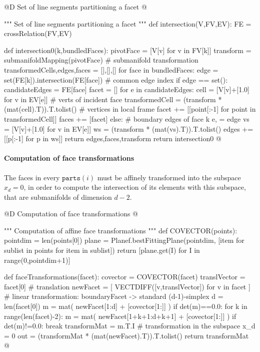 \documentclass[11pt,oneside]{article}    %
\begin{document}
@D Set of line segments partitioning a facet
@{""" Set of line segments partitioning a facet """
def intersection(V,FV,EV):
    FE = crossRelation(FV,EV)

    def intersection0(k,bundledFaces):
        pivotFace = [V[v] for v in FV[k]]
        transform = submanifoldMapping(pivotFace)  # submanifold transformation
        transformedCells,edges,faces = [],[],[]
        for face in bundledFaces:
            edge = set(FE[k]).intersection(FE[face])  # common edge index
            if edge == set():
                candidateEdges = FE[face]
                facet = []
                for e in candidateEdges:
                    cell = [V[v]+[1.0] for v in EV[e]]  # verts of incident face
                    transformedCell = (transform * (mat(cell).T)).T.tolist()  
                    # vertices in local frame
                    facet += [[point[:-1] for point in transformedCell]]
                faces += [facet]
            else:  # boundary edges of face k
                e, = edge
                vs = [V[v]+[1.0] for v in EV[e]]
                ws = (transform * (mat(vs).T)).T.tolist()
                edges += [[p[:-1] for p in ws]]
        return edges,faces,transform
    return intersection0    
@}



\paragraph{Computation of face transformations}
The faces in every $\texttt{parts}(i)$ must be affinely transformed into the subspace $x_d=0$, in order to compute the intersection of its elements with this subspace, that are submanifolds of dimension $d-2$.

@D Computation of face transformations
@{""" Computation of affine face transformations """
def COVECTOR(points):
    pointdim = len(points[0])
    plane = Planef.bestFittingPlane(pointdim,
                    [item for sublist in points for item in sublist])
    return [plane.get(I) for I in range(0,pointdim+1)]

def faceTransformations(facet):
    covector = COVECTOR(facet)
    translVector = facet[0]
    # translation 
    newFacet = [ VECTDIFF([v,translVector]) for v in facet ]
    # linear transformation: boundaryFacet -> standard (d-1)-simplex
    d = len(facet[0])
    m = mat( newFacet[1:d] + [covector[1:]] )
    if det(m)==0.0:
        for k in range(len(facet)-2):
            m = mat( newFacet[1+k+1:d+k+1] + [covector[1:]] )
            if det(m)!=0.0: break
    transformMat = m.T.I
    # transformation in the subspace x_d = 0
    out = (transformMat * (mat(newFacet).T)).T.tolist()
    return transformMat
@}
    
\end{document}

